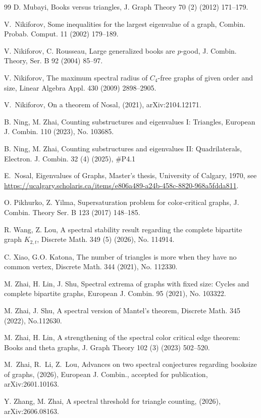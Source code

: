\documentclass[11pt,a4paper]{article}
\theoremstyle{definition}
\theoremstyle{plain}
\begin{document}
\begin{thebibliography}{99}
D. Mubayi,  Books versus triangles, 
J. Graph Theory 70 (2) (2012) 171--179. 

V.~Nikiforov,
Some inequalities for the largest eigenvalue of a graph, 
{Combin. Probab. Comput.} {11} (2002) 179--189.


V. Nikiforov, C. Rousseau, Large generalized books are $p$-good, 
J. Combin. Theory, Ser. B 92 (2004) 85--97. 

V. Nikiforov, 
The maximum spectral radius of $C_4$-free graphs of given order and size, 
Linear Algebra Appl. 430 (2009) 2898--2905. 
 

V.~Nikiforov,
On a theorem of Nosal, (2021), 
arXiv:2104.12171.

B. Ning, M. Zhai,
Counting substructures and eigenvalues I: Triangles,
{European J. Combin.} 110 (2023), No. 103685. 


B. Ning, M. Zhai, Counting substructures and eigenvalues II: Quadrilaterals, 
Electron. J. Combin. 32 (4) (2025), \#P4.1 

E.~Nosal,
{Eigenvalues of Graphs},
Master's thesis, University of Calgary, 1970, 
see \url{https://ucalgary.scholaris.ca/items/e806a489-a24b-458c-8820-968a5fdda811}. 

O. Pikhurko, Z. Yilma, 
Supersaturation problem for color-critical graphs, 
J. Combin. Theory Ser. B 123 (2017) 148--185.

R. Wang, Z. Lou, A spectral stability result regarding the complete bipartite graph $K_{2,t}$, 
Discrete Math. 349 (5) (2026), No. 114914. 

C. Xiao, G.O. Katona, 
 The number of triangles is more when they have no 
 common vertex, Discrete Math. 344 (2021), No. 112330. 
 
 M. Zhai,  H. Lin,  J. Shu, 
Spectral extrema of graphs with fixed size: Cycles and complete bipartite graphs, 
European J. Combin. 95 (2021), No. 103322. 

M. Zhai, J. Shu, 
A spectral version of Mantel's theorem, 
Discrete Math. 345 (2022), No.112630. 

M. Zhai, H. Lin,
A strengthening of the spectral color critical edge theorem: Books and theta graphs,
J. Graph Theory 102 (3) (2023) 502--520. 

M.~Zhai, R.~Li, Z.~Lou,
Advances on two spectral conjectures regarding booksize of graphs, (2026), 
{European J. Combin.}, accepted for publication,
arXiv:2601.10163.

Y. Zhang, M. Zhai, 
A spectral threshold for triangle counting, (2026), arXiv:2606.08163. 

\end{thebibliography}
\end{document}
